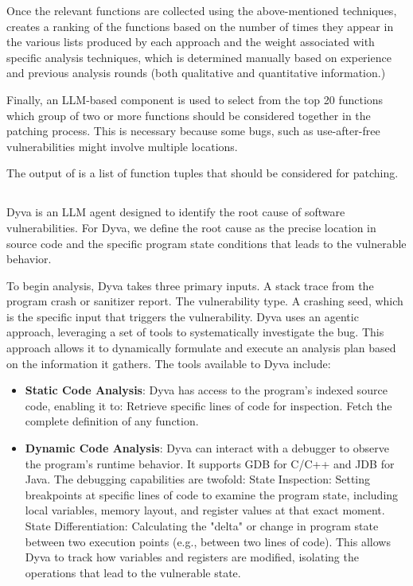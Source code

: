 Once the relevant functions are collected using the above-mentioned techniques, \kumushi creates a ranking of the functions based on the number of times they appear in the various lists produced by each approach and the weight associated with specific analysis techniques, which is determined manually based on experience and previous analysis rounds (both qualitative and quantitative information.)

Finally, an LLM-based component is used to select from the top 20 functions which group of two or more functions should be considered together in the patching process.
This is necessary because some bugs, such as use-after-free vulnerabilities might involve multiple locations.

The output of \kumushi is a list of function tuples that should be considered for patching.

\subsection{\dyva} 
Dyva is an LLM agent designed to identify the root cause of software vulnerabilities. 
For Dyva, we define the root cause as the precise location in source code and the specific program state conditions that leads to the vulnerable behavior. 

To begin analysis, Dyva takes three primary inputs.  A stack trace from the program crash or sanitizer report.
 The vulnerability type.
 A crashing seed, which is the specific input that triggers the vulnerability.
Dyva uses an agentic approach, leveraging a set of tools to systematically investigate the bug. 
This approach allows it to dynamically formulate and execute an analysis plan based on the information it gathers. 
The tools available to Dyva include:
\begin{itemize}
    \item \textbf{Static Code Analysis}: Dyva has access to the program's indexed source code, enabling it to:  Retrieve specific lines of code for inspection.  
    Fetch the complete definition of any function.
    \item \textbf{Dynamic Code Analysis}: Dyva can interact with a debugger to observe the program's runtime behavior. It supports GDB for C/C++ and JDB for Java. The debugging capabilities are twofold:  State Inspection: Setting breakpoints at specific lines of code to examine the program state, including local variables, memory layout, and register values at that exact moment.  State Differentiation: Calculating the "delta" or change in program state between two execution points (e.g., between two lines of code). This allows Dyva to track how variables and registers are modified, isolating the operations that lead to the vulnerable state.
\end{itemize}

